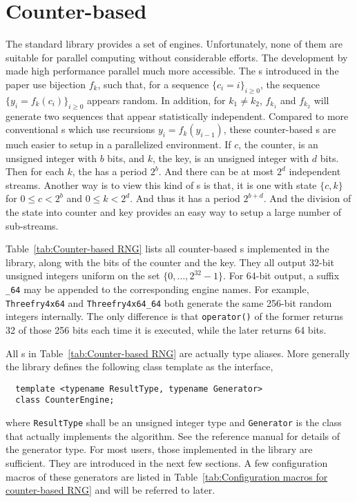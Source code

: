 \section{Counter-based \texorpdfstring{\protect\rng}{RNG}}
\label{sec:Counter-based RNG}

The standard library provides a set of \rng engines. Unfortunately, none of
them are suitable for parallel computing without considerable efforts. The
development by \cite{Salmon:2011um} made high performance parallel \rng much
more accessible. The \rng{}s introduced in the paper use bijection $f_k$, such
that, for a sequence $\{c_i = i\}_{i\ge0}$, the sequence $\{y_i =
f_k(c_i)\}_{i\ge0}$ appears random. In addition, for $k_1 \ne k_2$, $f_{k_1}$
and $f_{k_2}$ will generate two sequences that appear statistically
independent. Compared to more conventional \rng{}s which use recursions $y_i =
f_k(y_{i - 1})$, these counter-based \rng{}s are much easier to setup in a
parallelized environment. If $c$, the counter, is an unsigned integer with $b$
bits, and $k$, the key, is an unsigned integer with $d$ bits. Then for each
$k$, the \rng has a period $2^b$. And there can be at most $2^d$ independent
streams. Another way is to view this kind of \rng{}s is that, it is one \rng{}
with state $\{c, k\}$ for $0 \le c < 2^b$ and $0 \le k < 2^d$. And thus it has
a period $2^{b + d}$. And the division of the state into counter and key
provides an easy way to setup a large number of sub-streams.

Table~\ref{tab:Counter-based RNG} lists all counter-based \rng{}s implemented
in the library, along with the bits of the counter and the key. They all output
32-bit unsigned integers uniform on the set $\{0,\dots,2^{32}-1\}$. For 64-bit
output, a suffix \verb|_64| may be appended to the corresponding \rng engine
names. For example, \verb|Threefry4x64| and \verb|Threefry4x64_64| both
generate the same 256-bit random integers internally. The only difference is
that \verb|operator()| of the former returns 32 of those 256 bits each time it
is executed, while the later returns 64 bits.

All \rng{}s in Table~\ref{tab:Counter-based RNG} are actually type aliases.
More generally the library defines the following class template as the
interface,
\begin{Verbatim}
  template <typename ResultType, typename Generator>
  class CounterEngine;
\end{Verbatim}
where \verb|ResultType| shall be an unsigned integer type and \verb|Generator|
is the class that actually implements the algorithm. See the reference manual
for details of the generator type. For most users, those implemented in the
library are sufficient. They are introduced in the next few sections. A few
configuration macros of these generators are listed in
Table~\ref{tab:Configuration macros for counter-based RNG} and will be referred
to later.


